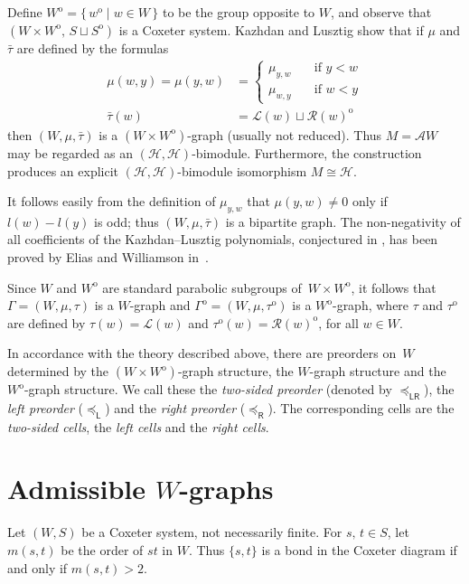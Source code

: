 \documentclass[ALCO,ThmDefs,Unicode,epreuves]{cedram}
\DeclareMathOperator{\orm}{o}
\newcommand{\opp}{^{\orm}}
\newcommand{\leftright}{_{\mathsf{LR}}}
\newcommand{\lside}{_{\mathsf{L}}}
\newcommand{\rside}{_{\mathsf{R}}}
\begin{document}
Define $W\opp=\{\,w\opp\mid w\in W\,\}$ to be the group opposite to $W\!$, and
observe that $(W\times W\opp\!,\,S\sqcup S\opp)$ is a Coxeter system.
Kazhdan and Lusztig show that if $\mu$ and $\bar\tau$ are defined by the formulas
\begin{align*}
\mu(w,y)=\mu(y,w) &= \begin{cases}
 \mu_{y,w} &\quad \text{if $y < w$}\\
 \mu_{w,y} &\quad \text{if $w < y$}
 \end{cases}\\
\bar\tau(w) &= \mathcal{L}(w)\sqcup\mathcal{R}(w)\opp
\end{align*}
then $(W,\mu,\bar\tau)$ is a $(W\times W\opp)$-graph (usually not reduced).
Thus $M=\mathcal{A}W$ may be regarded as an
$(\mathcal{H},\mathcal{H})$-bimodule. Furthermore, the construction
produces an explicit $(\mathcal{H},\mathcal{H})$-bimodule isomorphism
$M\cong\mathcal{H}$.

It follows easily from the definition of $\mu_{y,w}$ that $\mu(y,w)\neq 0$ only
if $l(w)-l(y)$ is odd; thus $(W,\mu,\bar\tau)$ is a bipartite graph. The non-negativity
of all coefficients of the Kazhdan--Lusztig polynomials, conjectured in
\cite{kazlus:coxhecke}, has been proved by Elias
and Williamson in~\cite{bengeogedi:howgesoerge}.

Since $W$ and $W\opp$ are standard parabolic subgroups of~$W\times W\opp$, it follows
that $\Gamma=(W,\mu,\tau)$ is a $W\!$-graph and $\Gamma\opp=(W,\mu,\tau\opp)$ is a
$W\opp\!$-graph, where $\tau$ and $\tau\opp$ are defined by
$\tau(w)=\mathcal{L}(w)$ and $\tau\opp(w)=\mathcal{R}(w)\opp$, for all $w\in W$.

In accordance with the theory described above, there are preorders on~$W$
determined by the $(W\times W\opp)$-graph structure, the $W\!$-graph structure
and the $W\opp\!$-graph structure. We call these the \emph{two-sided preorder}
(denoted by $\preceq\leftright$), the \emph{left preorder} ($\preceq\lside$)
and the \emph{right preorder} ($\preceq\rside$). The
corresponding cells are the \emph{two-sided cells}, the \emph{left cells}
and the \emph{right cells}.

\section{Admissible \texorpdfstring{$W$}{W}-graphs}
\label{sec:5}

Let $(W,S)$ be a Coxeter system, not necessarily finite. For $s,\,t\in S$,
let $m(s,t)$ be the order of $st$ in $W\!$. Thus $\{s,t\}$ is a
bond in the Coxeter diagram if and only if $m(s,t)>2$.
\end{document}
